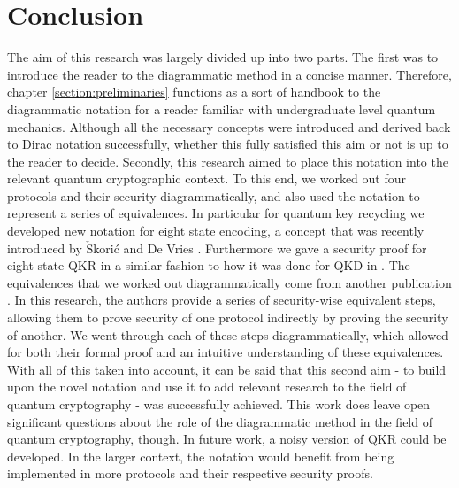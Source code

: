 \documentclass[]{article}
\begin{document}
\section{Conclusion}

The aim of this research was largely divided up into two parts. The first was to introduce the reader to the diagrammatic method in a concise manner. Therefore, chapter \ref{section:preliminaries} functions as a sort of handbook to the diagrammatic notation for a reader familiar with undergraduate level quantum mechanics. Although all the necessary concepts were introduced and derived back to Dirac notation successfully, whether this fully satisfied this aim or not is up to the reader to decide. Secondly, this research aimed to place this notation into the relevant quantum cryptographic context. To this end, we worked out four protocols and their security diagrammatically, and also used the notation to represent a series of equivalences. In particular for quantum key recycling we developed new notation for eight state encoding, a concept that was recently introduced by $\check{\textrm{S}}$korić and De Vries \cite{DeVries2016}. Furthermore we gave a security proof for eight state QKR in a similar fashion to how it was done for QKD in \cite{Kissinger2017}. The equivalences that we worked out diagrammatically come from another publication \cite{cryptoeprint:2019:875}. In this research, the authors provide a series of security-wise equivalent steps, allowing them to prove security of one protocol indirectly by proving the security of another. We went through each of these steps diagrammatically, which allowed for both their formal proof and an intuitive understanding of these equivalences. With all of this taken into account, it can be said that this second aim - to build upon the novel notation and use it to add relevant research to the field of quantum cryptography - was successfully achieved. This work does leave open significant questions about the role of the diagrammatic method in the field of quantum cryptography, though. In future work, a noisy version of QKR could be developed. In the larger context, the notation would benefit from being implemented in more protocols and their respective security proofs.

\end{document}

